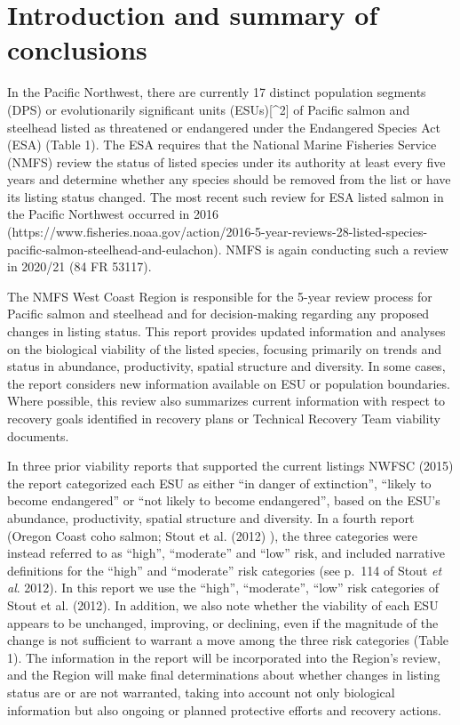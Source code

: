 \documentclass[
  letterpaper,
  oneside,
  open=any]{scrbook}
\begin{document}

\hypertarget{introduction-and-summary-of-conclusions}{%
\chapter{Introduction and summary of
conclusions}\label{introduction-and-summary-of-conclusions}}

In the Pacific Northwest, there are currently 17 distinct population
segments (DPS) or evolutionarily significant units (ESUs){[}\^{}2{]} of
Pacific salmon and steelhead listed as threatened or endangered under
the Endangered Species Act (ESA) (Table 1). The ESA requires that the
National Marine Fisheries Service (NMFS) review the status of listed
species under its authority at least every five years and determine
whether any species should be removed from the list or have its listing
status changed. The most recent such review for ESA listed salmon in the
Pacific Northwest occurred in 2016
(https://www.fisheries.noaa.gov/action/2016-5-year-reviews-28-listed-species-pacific-salmon-steelhead-and-eulachon).
NMFS is again conducting such a review in 2020/21 (84 FR 53117).

The NMFS West Coast Region is responsible for the 5-year review process
for Pacific salmon and steelhead and for decision-making regarding any
proposed changes in listing status. This report provides updated
information and analyses on the biological viability of the listed
species, focusing primarily on trends and status in abundance,
productivity, spatial structure and diversity. In some cases, the report
considers new information available on ESU or population boundaries.
Where possible, this review also summarizes current information with
respect to recovery goals identified in recovery plans or Technical
Recovery Team viability documents.

In three prior viability reports that supported the current listings
NWFSC (2015) the report categorized each ESU as either ``in danger of
extinction'', ``likely to become endangered'' or ``not likely to become
endangered'', based on the ESU's abundance, productivity, spatial
structure and diversity. In a fourth report (Oregon Coast coho salmon;
Stout et al. (2012) ), the three categories were instead referred to as
``high'', ``moderate'' and ``low'' risk, and included narrative
definitions for the ``high'' and ``moderate'' risk categories (see
p.~114 of Stout \emph{et al}. 2012). In this report we use the ``high'',
``moderate'', ``low'' risk categories of Stout et al. (2012). In
addition, we also note whether the viability of each ESU appears to be
unchanged, improving, or declining, even if the magnitude of the change
is not sufficient to warrant a move among the three risk categories
(Table 1). The information in the report will be incorporated into the
Region's review, and the Region will make final determinations about
whether changes in listing status are or are not warranted, taking into
account not only biological information but also ongoing or planned
protective efforts and recovery actions.
\end{document}
